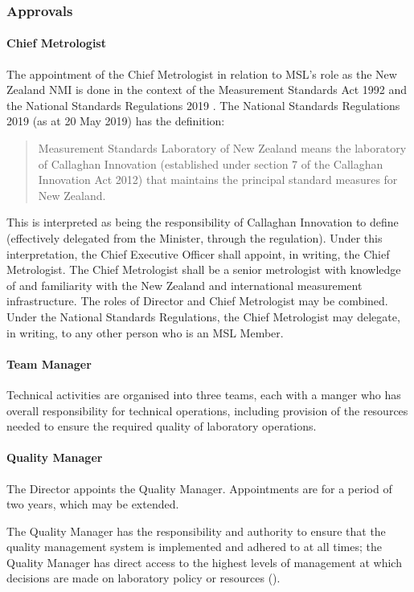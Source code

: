 \subsubsection{Approvals}
\paragraph{Chief Metrologist}    

The appointment of the Chief Metrologist in relation to MSL's role as the New Zealand NMI is done in the context of the Measurement Standards Act 1992 \cite{MS_ACT_1992} and the National Standards Regulations 2019 \cite{NS_Regulations}.
The National Standards Regulations 2019 (as at 20 May 2019) has the definition:
\begin{quote}
Measurement Standards Laboratory of New Zealand means the laboratory of Callaghan 
Innovation (established under section 7 of the Callaghan Innovation Act 2012) that maintains 
the principal standard measures for New Zealand.
\end{quote}
This is interpreted as being the responsibility of Callaghan Innovation to define (effectively delegated from the Minister, through the regulation). Under this interpretation, the Chief Executive Officer shall appoint, in writing, the Chief Metrologist. The Chief Metrologist shall be a senior metrologist with knowledge of and familiarity with the New Zealand and international measurement infrastructure. The roles of Director and Chief Metrologist may be combined.
Under the National Standards Regulations, the Chief Metrologist may delegate, in writing, to any other person who is an MSL Member.
\paragraph{Team Manager}
Technical activities are organised into three teams, each with a manger who has overall responsibility for technical operations, including provision of the resources needed to ensure the required quality of laboratory operations. 
\paragraph{Quality Manager}
The Director appoints the Quality Manager. Appointments are for a period of two years, which may be extended. 

The Quality Manager has the responsibility and authority to ensure that the quality management system is implemented and adhered to at all times; the Quality Manager has direct access to the highest levels of management at which decisions are made on laboratory policy or resources ().

